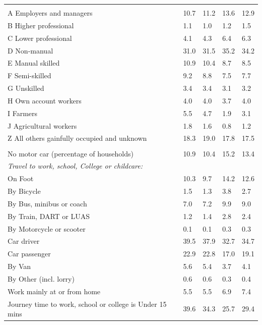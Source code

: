 \documentclass{article}
\begin{document}
\begin{table}[h]
\begin{tabular}{KTTTT}
\hline
    \\ 
    \hline
A Employers and managers & 10.7& 11.2& 13.6& 12.9\\
B Higher professional & 1.1& 1.0& 1.2& 1.5\\
C Lower professional & 4.1& 4.3& 6.4& 6.3\\
D Non-manual & 31.0& 31.5& 35.2& 34.2\\
E Manual skilled & 10.9& 10.4&  8.7&  8.5\\
F Semi-skilled & 9.2& 8.8& 7.5& 7.7\\
G Unskilled & 3.4& 3.4& 3.1& 3.2\\
H Own account workers & 4.0& 4.0& 3.7& 4.0\\
I Farmers & 5.5& 4.7& 1.9& 3.1\\
J Agricultural workers & 1.8& 1.6& 0.8& 1.2\\
Z All others gainfully occupied and unknown & 18.3& 19.0& 17.8& 17.5\\
\hline
{}\hline
    \\ 
    \hline
No motor car (percentage of households) & 10.9& 10.4& 15.2& 
13.4\\
    \hline 
\emph{Travel to work, school, College or childcare:} & & & \\
\quad On Foot & 10.3&  9.7& 14.2& 12.6\\ 
\quad By Bicycle & 1.5& 1.3& 3.8& 2.7\\ 
\quad By Bus, minibus or coach & 7.0& 7.2& 9.9& 9.0\\
\quad By Train, DART or LUAS & 1.2& 1.4& 2.8& 2.4\\
\quad By Motorcycle or scooter & 0.1& 0.1& 0.3& 0.3\\
\quad Car driver & 39.5 & 37.9& 32.7& 34.7\\
\quad Car passenger & 22.9& 22.8& 17.0& 19.1\\
\quad By Van & 5.6& 5.4& 3.7& 4.1\\
\quad By Other (incl. lorry) & 0.6& 0.6& 0.3& 0.4\\
    \hline
Work mainly at or from home & 5.5& 5.5& 6.9& 7.4\\
Journey time to work, school or college is Under 15 mins & 39.6& 34.3& 25.7& 29.4\\

\end{tabular}
\end{table}
\end{document}
